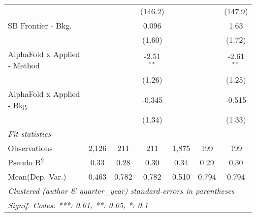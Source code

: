 \begin{tabular}{lcccccc}
                                &                &              & (146.2)      &                &              & (147.9)\\   
   SB Frontier - Bkg.           &                &              & 0.096        &                &              & 1.63\\   
                                &                &              & (1.60)       &                &              & (1.72)\\   
   AlphaFold x Applied - Method &                &              & -2.51$^{**}$ &                &              & -2.61$^{**}$\\   
                                &                &              & (1.26)       &                &              & (1.25)\\   
   AlphaFold x Applied - Bkg.   &                &              & -0.345       &                &              & -0.515\\   
                                &                &              & (1.34)       &                &              & (1.33)\\   
   \midrule
   \emph{Fit statistics}\\
   Observations                 & 2,126          & 211          & 211          & 1,875          & 199          & 199\\  
   Pseudo R$^2$                 & 0.33           & 0.28         & 0.30         & 0.34           & 0.29         & 0.30\\  
Mean(Dep. Var.) & 0.463 & 0.782 & 0.782 & 0.510 & 0.794 & 0.794 \\
   \midrule \midrule
   \multicolumn{7}{l}{\emph{Clustered (author \& quarter\_year) standard-errors in parentheses}}\\
   \multicolumn{7}{l}{\emph{Signif. Codes: ***: 0.01, **: 0.05, *: 0.1}}\\
\end{tabular}
\par\endgroup
